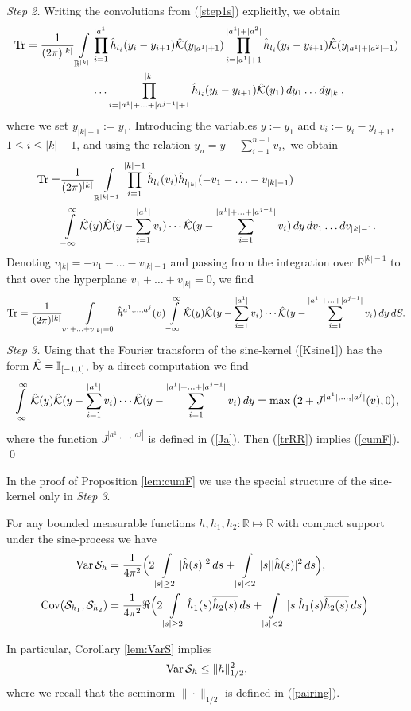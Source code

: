 \documentclass{article}
\numberwithin{equation}{section}
\newcommand{\mR}{\mathbb{R}}
\newcommand{\mI}{\mathbb{I}}
\newcommand{\SSS}{{\cal S}}
\newcommand{\KK}{{\cal K}}
\newcommand{\Cov}{\operatorname{Cov}}
\newcommand{\Var}{\operatorname{Var}}
\newcommand{\ov}{\overline}
\newcommand{\ssk}{\smallskip}
\newcommand{\fr}{\frac}
\newcommand{\sli}{\sum\limits}
\newcommand{\ili}{\int\limits}
\newcommand{\lbl}{\label}
\newcommand{\rprop}{Proposition \nolinebreak}
\newcommand{\bee}{\begin{equation}}
\newcommand{\eee}{\end{equation}}
\newcommand{\brr}{\begin{rem}}
\newcommand{\err}{\end{rem}}
\newcommand{\non}{\nonumber}
\begin{document}
\ssk
{\it Step 2.} Writing the convolutions from  (\ref{step1s}) explicitly,
we obtain
\begin{align}\non
\mbox{Tr}
=\fr{1}{(2\pi)^{|k|}}\ili_{\mR^{|k|}} &\prod\limits_{i=1}^{|a^1|} \hat h_{l_i}(y_i-y_{i+1})\hat \KK(y_{|a^1|+1})
\prod\limits_{i=|a^1|+1}^{|a^1|+|a^2|}  \hat h_{l_i}(y_i-y_{i+1})\hat \KK(y_{|a^1|+|a^2|+1})
\\\non
&\ldots
\prod\limits_{i=|a^1|+\ldots+|a^{j-1}|+1}^{|k|}  \hat h_{l_i}(y_i-y_{i+1})\hat \KK(y_1)
\,dy_1\ldots dy_{|k|},
\end{align}
where we set $y_{|k|+1}:=y_1$.
Introducing the variables $y:=y_1$ and $v_i:=y_i-y_{i+1}$, $1\leq i\leq |k|-1$,
and using the relation
$
y_n=y-\sli_{i=1}^{n-1} v_i,
$
we obtain
\begin{align}\non
\mbox{Tr}=&\fr{1}{(2\pi)^{|k|}}\ili_{\mR^{|k|-1}} \prod\limits_{i=1}^{|k|-1}\hat h_{l_i}(v_i)
\hat h_{l_{|k|}}(-v_1-\ldots-v_{|k|-1})
\\\non
&
\ili_{-\infty}^\infty\hat \KK(y)\hat \KK(y-\sli_{i=1}^{|a^1|}v_i) \cdots
\hat \KK(y-\sli_{i=1}^{|a^1|+\ldots + |a^{j-1}|} v_i)\, dy \,d v_1\ldots d v_{|k|-1}.
\end{align}
Denoting
$v_{|k|}=-v_{1}-\ldots -v_{|k|-1}$
and passing from the integration over $\mR^{|k|-1}$
to that over the hyperplane
$v_{1}+\ldots +v_{|k|}=0$, we find
\bee\lbl{trRR}
\mbox{Tr}=\fr{1}{(2\pi)^{|k|}}\ili_{v_1+\ldots+ v_{|k|}=0} \hat h^{a^1,\ldots,a^j}(v)
\ili_{-\infty}^\infty\hat \KK(y)\hat \KK(y-\sli_{i=1}^{|a^1|}v_i) \cdots
\hat \KK(y-\sli_{i=1}^{|a^1|+\ldots + |a^{j-1}|} v_i)\, dy \,dS.
\eee
{\it Step 3.}
Using that the Fourier transform of the sine-kernel (\ref{Ksine1}) has the form  $\hat\KK=\mI_{[-1,1]}$,
by a direct computation we find
\bee\lbl{Soshid}
\ili_{-\infty}^\infty\hat \KK(y)\hat \KK(y-\sli_{i=1}^{|a^1|}v_i) \cdots
\hat \KK(y-\sli_{i=1}^{|a^1|+\ldots + |a^{j-1}|} v_i)\, dy = \max\big(2 + J^{|a^1|,\ldots,|a^j|}(v), 0\big),
\eee
where the function $J^{|a^1|,\ldots,|a^j|}$ is defined in (\ref{Ja}).
Then (\ref{trRR}) implies (\ref{cumF}).
\qed
\brr
In the proof of \rprop \ref{lem:cumF}
we use the special structure of the sine-kernel only in {\it Step 3}.
\err


\begin{cor}\lbl{lem:VarS}
For any bounded measurable functions $h,h_1,h_2:\mR\mapsto\mR$ with compact support
under the sine-process we have
\begin{align}\lbl{varS}
\Var\SSS_{h} &= \fr{1}{4\pi^2}
\Big(
2\ili_{|s|\geq 2} |\hat h(s)|^2\,ds
+ \ili_{|s|<2} |s| |\hat h(s)|^2\,ds
\Big),\\\lbl{covarsinus}
\Cov(\SSS_{h_1},\SSS_{h_2})&=
\fr{1}{4\pi^2}
\Re\Big(
2\ili_{|s|\geq 2} \hat h_1(s)\ov{\hat h_2(s)}\,ds
+ \ili_{|s|<2} |s| \hat h_1(s)\ov{\hat h_2(s)}\,ds
\Big).
\end{align}
\end{cor}
In particular, Corollary \ref{lem:VarS} implies
\bee\lbl{var12}
\Var\SSS_{h} \leq \|h\|_{1/2}^2,
\eee
where we 
recall that the seminorm $\|\cdot\|_{1/2}$ is defined in (\ref{pairing}).
\end{document}
